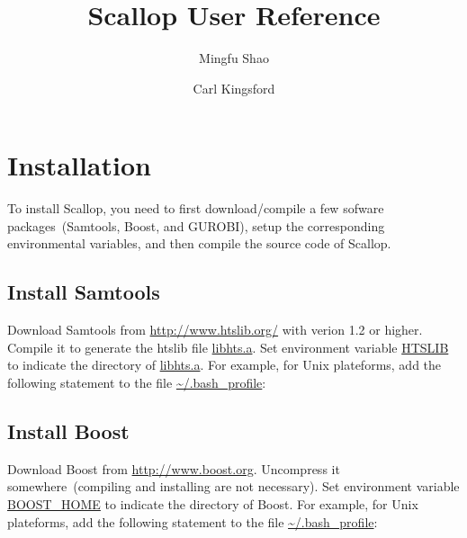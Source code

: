 \documentclass{llncs}
\begin{document}
%
\frontmatter          %
%
\pagestyle{headings}  %
%
%
\mainmatter              %
%
\title{Scallop User Reference}
%
%
\author{Mingfu Shao \and Carl Kingsford}
%
%

\maketitle              %

\section{Installation}
To install Scallop, you need to first download/compile a few sofware packages~(Samtools,
Boost, and GUROBI), setup the corresponding environmental variables, and then
compile the source code of Scallop.

\subsection{Install Samtools}
Download Samtools from \url{http://www.htslib.org/} with verion 1.2 or higher.
Compile it to generate the htslib file \url{libhts.a}. Set environment variable
\url{HTSLIB} to indicate the directory of \url{libhts.a}. 
For example, for Unix plateforms, add the following
statement to the file \url{~/.bash_profile}:\\

\subsection{Install Boost}
Download Boost from \url{http://www.boost.org}. Uncompress it
somewhere~(compiling and installing are not necessary). Set environment
variable \url{BOOST_HOME} to indicate the directory of Boost.
For example, for Unix plateforms, add the following
statement to the file \url{~/.bash_profile}:\\
\end{document}
